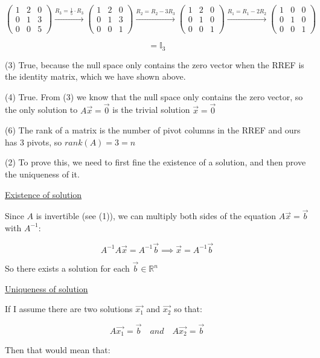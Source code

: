 \documentclass[11pt, a4paper]{article}
\begin{document}
\[
\begin{pmatrix}
	1 & 2 & 0 \\
	0 & 1 & 3 \\
	0 & 0 & 5
\end{pmatrix} \xrightarrow{R_3 = \frac{1}{5} \cdot R_3} 
\begin{pmatrix}
	1 & 2 & 0 \\
	0 & 1 & 3 \\
	0 & 0 & 1
\end{pmatrix} \xrightarrow{R_2 = R_2 - 3R_3}
\begin{pmatrix}
	1 & 2 & 0 \\
	0 & 1 & 0 \\
	0 & 0 & 1
\end{pmatrix} \xrightarrow{R_1 = R_1 - 2R_2}
\begin{pmatrix}
	1 & 0 & 0 \\
	0 & 1 & 0 \\
	0 & 0 & 1
\end{pmatrix}
\]

\[
	= \mathds{I}_3
\]

(3) True, because the null space only contains the zero vector when the RREF is the identity matrix, which we have shown above.

(4) True. From (3) we know that the null space only contains the zero vector, so the only solution to $A\vec{x} = \vec{0}$ is the trivial solution $\vec{x} = \vec{0}$

(6) The rank of a matrix is the number of pivot columns in the RREF and ours has 3 pivots, so $rank(A) = 3 = n$

(2) To prove this, we need to first fine the existence of a solution, and then prove the uniqueness of it.

\underline{Existence of solution}

Since $A$ is invertible (see (1)), we can multiply both sides of the equation $A\vec{x} = \vec{b}$ with $A^{-1}$:

\[
A^{-1}A\vec{x} = A^{-1}\vec{b} \implies \vec{x} = A^{-1}\vec{b}
\]

So there exists a solution for each $\vec{b} \in {\mathbb{R}}^n$

\underline{Uniqueness of solution}

If I assume there are two solutions $\vec{x_1}$ and $\vec{x_2}$ so that:

\[
A\vec{x_1} = \vec{b} \quad and \quad A\vec{x_2} = \vec{b}
\]

Then that would mean that:
\end{document}
